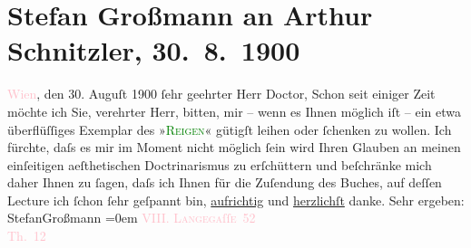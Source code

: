 

               \section[Stefan Großmann an Arthur Schnitzler, 30. 8. 1900]{ Stefan Großmann an Arthur Schnitzler, 30. 8. 1900}\nopagebreak{}\rehead{ }\normalsize\beginnumbering{} \toendnotes[C]{\smallbreak\pagebreak[2]} 
\pstart
           \raggedleft{}{\pb}\textcolor{pink}{Wien}{}\ledrightnote{\textcolor{pink}{Wien}}, den 30. Auguſt 1900\pend
           \pstart{}ſehr geehrter Herr Doctor,\pend\pstart
           Schon seit einiger Zeit möchte ich Sie, verehrter Herr, bitten, mir – wenn es Ihnen
               möglich iſt – ein \introOben{}etwa\introOben{} überflüſſiges Exemplar des »\textcolor{green}{\textsc{Reigen}}{}\ledrightnote{\textcolor{green}{Reigen. Zehn Dialoge}}« gütigſt leihen oder ſchenken zu wollen.\pend
           \pstart
           Ich fürchte, daſs es mir im Moment nicht möglich ſein wird Ihren Glauben an meinen
               einſeitigen aeſthetischen Doctrinarismus zu erſchüttern und beſchränke mich daher
               Ihnen zu ſagen, daſs ich Ihnen für die Zuſendung des Buches, {\pb}auf deſſen Lecture ich ſchon ſehr geſpannt
               bin, \uline{aufrichtig} und \uline{herzlichſt} danke.\pend
           \pstart
           Sehr ergeben:{\\[\baselineskip]}\spacefill\mbox{StefanGroßmann}\pend
           \leftskip=0em{}\pstart
           \noindent{}\raggedleft{}\textcolor{pink}{VIII. \textsc{Langega}ſſ\textsc{e} 52{\\}Th. 12}{}\ledrightnote{\textcolor{pink}{Lange Gasse}}\pend
           \endnumbering{}  
      